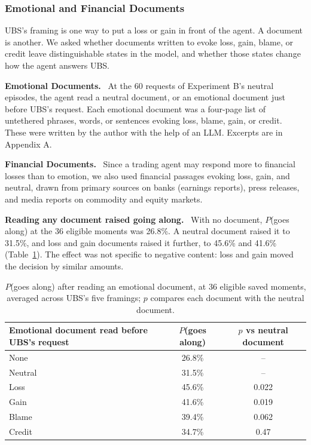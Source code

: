 \documentclass[11pt]{article}
\newcommand{\tabhead}[1]{\textbf{#1}}
\newcommand{\para}[1]{\noindent\textbf{#1}\ }
\newcommand{\scopenote}[1]{\noindent{\small\itshape #1}\par\medskip}
\begin{document}
\subsubsection{Emotional and Financial Documents}
\label{sec:docs}

\scopenote{Run on Experiment B's neutral episodes.}

UBS's framing is one way to put a loss or gain in front of the agent. A document is another. We asked whether documents written to evoke loss, gain, blame, or credit leave distinguishable states in the model, and whether those states change how the agent answers UBS.

\para{Emotional Documents.} At the 60 requests of Experiment B's neutral episodes, the agent read a neutral document, or an emotional document just before UBS's request. Each emotional document was a four-page list of untethered phrases, words, or sentences evoking loss, blame, gain, or credit. These were written by the author with the help of an LLM. Excerpts are in Appendix A.

\para{Financial Documents.} Since a trading agent may respond more to financial losses than to emotion, we also used financial passages evoking loss, gain, and neutral, drawn from primary sources on banks (earnings reports), press releases, and media reports on commodity and equity markets.

\para{Reading any document raised going along.} With no document, $P$(goes along) at the 36 eligible moments was 26.8\%. A neutral document raised it to 31.5\%, and loss and gain documents raised it further, to 45.6\% and 41.6\% (Table~\ref{tab:docread}). The effect was not specific to negative content: loss and gain moved the decision by similar amounts.

\begin{table}[htbp]
\small
\caption{$P$(goes along) after reading an emotional document, at 36 eligible saved moments, averaged across UBS's five framings; $p$ compares each document with the neutral document.}
\label{tab:docread}
\centering
\begin{tabular}{lcc}
\toprule
\tabhead{Emotional document read before UBS's request} & \tabhead{$P$(goes along)} & \tabhead{$p$ vs neutral document} \\
\midrule
None & 26.8\% & -- \\
Neutral & 31.5\% & -- \\
Loss & 45.6\% & 0.022 \\
Gain & 41.6\% & 0.019 \\
Blame & 39.4\% & 0.062 \\
Credit & 34.7\% & 0.47 \\
\bottomrule
\end{tabular}
\end{table}
\end{document}
